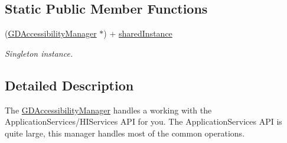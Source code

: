 \subsection*{Static Public Member Functions}
\begin{DoxyCompactItemize}
\item 
\hypertarget{interface_g_d_accessibility_manager_a435dd479b497690d4c34fe71da196da6}{
(\hyperlink{interface_g_d_accessibility_manager}{GDAccessibilityManager} $\ast$) + \hyperlink{interface_g_d_accessibility_manager_a435dd479b497690d4c34fe71da196da6}{sharedInstance}}
\label{interface_g_d_accessibility_manager_a435dd479b497690d4c34fe71da196da6}

\begin{DoxyCompactList}\small\item\em Singleton instance. \item\end{DoxyCompactList}\end{DoxyCompactItemize}


\subsection{Detailed Description}
The \hyperlink{interface_g_d_accessibility_manager}{GDAccessibilityManager} handles a working with the ApplicationServices/‍HIServices API for you. The ApplicationServices API is quite large, this manager handles most of the common operations.

